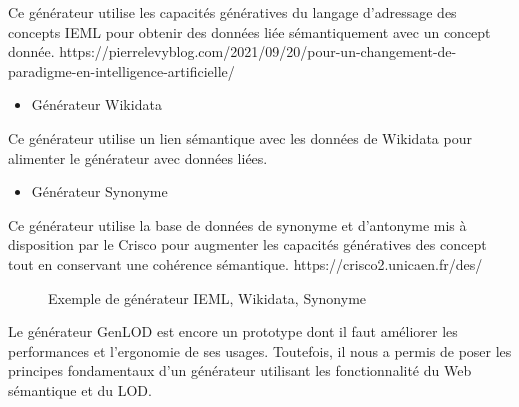 \documentclass[
  a4paper,
  DIV=11,
  numbers=noendperiod]{scrreprt}
\providecommand{\tightlist}{%
  \setlength{\itemsep}{0pt}\setlength{\parskip}{0pt}}\usepackage{longtable,booktabs,array}
\begin{document}
Ce générateur utilise les capacités génératives du langage d'adressage
des concepts IEML pour obtenir des données liée sémantiquement avec un
concept donnée.
https://pierrelevyblog.com/2021/09/20/pour-un-changement-de-paradigme-en-intelligence-artificielle/

\begin{itemize}
\tightlist
\item
  Générateur Wikidata
\end{itemize}

Ce générateur utilise un lien sémantique avec les données de Wikidata
pour alimenter le générateur avec données liées.

\begin{itemize}
\tightlist
\item
  Générateur Synonyme
\end{itemize}

Ce générateur utilise la base de données de synonyme et d'antonyme mis à
disposition par le Crisco pour augmenter les capacités génératives des
concept tout en conservant une cohérence sémantique.
https://crisco2.unicaen.fr/des/

\begin{figure}


\caption{\label{fig-GenLOGieml}Exemple de générateur IEML, Wikidata,
Synonyme}

\end{figure}%

Le générateur GenLOD est encore un prototype dont il faut améliorer les
performances et l'ergonomie de ses usages. Toutefois, il nous a permis
de poser les principes fondamentaux d'un générateur utilisant les
fonctionnalité du Web sémantique et du LOD.
\end{document}
